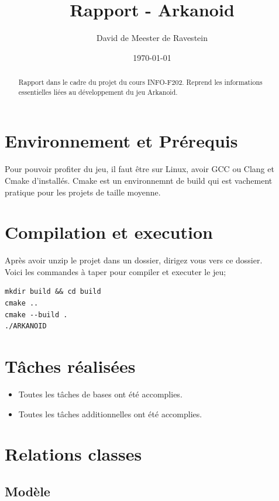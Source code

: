 \documentclass{article}
\title{Rapport - Arkanoid}
\author{David de Meester de Ravestein}
\date{\today}
\begin{document}
\maketitle

\begin{abstract}
Rapport dans le cadre du projet du cours INFO-F202. Reprend les informations essentielles liées au développement du jeu Arkanoid.
\end{abstract}

\tableofcontents

\newpage

\section{Environnement et Prérequis}

Pour pouvoir profiter du jeu, il faut être sur Linux, avoir GCC ou Clang et Cmake d'installés. Cmake est un environnemnt de build qui est vachement pratique pour les projets de taille moyenne.

\section{Compilation et execution}

Après avoir unzip le projet dans un dossier, dirigez vous vers ce dossier.\\
Voici les commandes à taper pour compiler et executer le jeu;
\begin{verbatim}
mkdir build && cd build
cmake ..
cmake --build .
./ARKANOID
\end{verbatim}

\section{Tâches réalisées}

\begin{itemize}
	\item Toutes les tâches de bases ont été accomplies.
	\item Toutes les tâches additionnelles ont été accomplies.
\end{itemize}

\section{Relations classes}

\subsection{Modèle}
\end{document}
